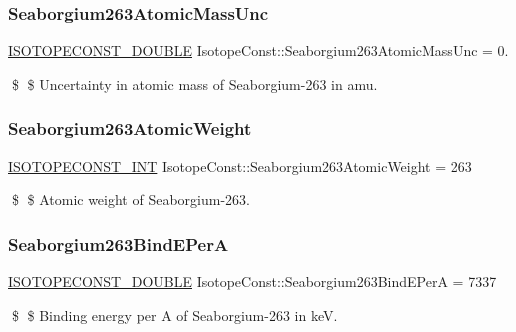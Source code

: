 \subsubsection{\texorpdfstring{Seaborgium263\+Atomic\+Mass\+Unc}{Seaborgium263AtomicMassUnc}}
{\footnotesize\ttfamily \mbox{\hyperlink{group___isotope_const-_macros_ga8f45a7272ce02c0b4c65c44636ed719a}{I\+S\+O\+T\+O\+P\+E\+C\+O\+N\+S\+T\+\_\+\+D\+O\+U\+B\+LE}} Isotope\+Const\+::\+Seaborgium263\+Atomic\+Mass\+Unc = 0.}

\$ \$ Uncertainty in atomic mass of Seaborgium-\/263 in amu. \mbox{\label{group___isotope_const-_seaborgium-_sg263_ga9c1d5b6e51069df540a5eea80c04abb1}} 
\subsubsection{\texorpdfstring{Seaborgium263\+Atomic\+Weight}{Seaborgium263AtomicWeight}}
{\footnotesize\ttfamily \mbox{\hyperlink{group___isotope_const-_macros_ga5f18360b3e99483a35c32d789e62621c}{I\+S\+O\+T\+O\+P\+E\+C\+O\+N\+S\+T\+\_\+\+I\+NT}} Isotope\+Const\+::\+Seaborgium263\+Atomic\+Weight = 263}

\$ \$ Atomic weight of Seaborgium-\/263. \mbox{\label{group___isotope_const-_seaborgium-_sg263_ga28c1520ca684b4273b15535dd0a8e77f}} 
\subsubsection{\texorpdfstring{Seaborgium263\+Bind\+E\+PerA}{Seaborgium263BindEPerA}}
{\footnotesize\ttfamily \mbox{\hyperlink{group___isotope_const-_macros_ga8f45a7272ce02c0b4c65c44636ed719a}{I\+S\+O\+T\+O\+P\+E\+C\+O\+N\+S\+T\+\_\+\+D\+O\+U\+B\+LE}} Isotope\+Const\+::\+Seaborgium263\+Bind\+E\+PerA = 7337}

\$ \$ Binding energy per A of Seaborgium-\/263 in keV. \mbox{\label{group___isotope_const-_seaborgium-_sg263_gae8bfc0ba0f4fe33eb08e662a2a776574}} 
